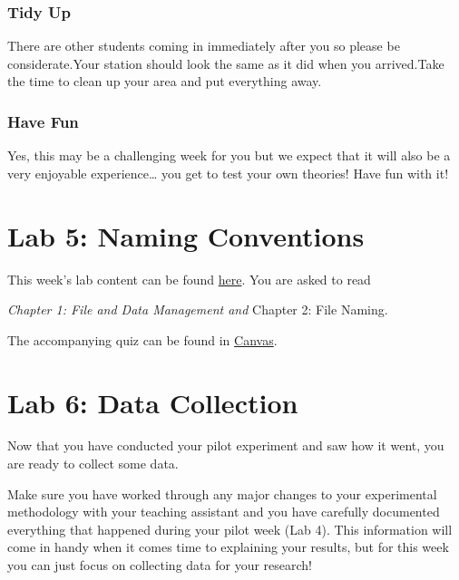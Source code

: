 \documentclass[
]{book}
\begin{document}
\hypertarget{tidy-up}{%
\subsection*{Tidy Up}\label{tidy-up}}

There are other students coming in immediately after you so please be considerate.Your station should look the same as it did when you arrived.Take the time to clean up your area and put everything away.

\hypertarget{have-fun}{%
\subsection*{Have Fun}\label{have-fun}}

Yes, this may be a challenging week for you but we expect that it will also be a very enjoyable experience\ldots{} you get to test your own theories! Have fun with it!

\hypertarget{lab-5-naming-conventions}{%
\chapter*{Lab 5: Naming Conventions}\label{lab-5-naming-conventions}}

This week's lab content can be found \href{https://ubco-biology.github.io/Procedures-and-Guidelines/file-and-data-management.html}{here}. You are asked to read

\emph{Chapter 1: File and Data Management and
} Chapter 2: File Naming.

The accompanying quiz can be found in \href{https://canvas.ubc.ca}{Canvas}.

\hypertarget{lab-6-data-collection}{%
\chapter*{Lab 6: Data Collection}\label{lab-6-data-collection}}

Now that you have conducted your pilot experiment and saw how it went, you are ready to collect some data.

Make sure you have worked through any major changes to your experimental methodology with your teaching assistant and you have carefully documented everything that happened during your pilot week (Lab 4). This information will come in handy when it comes time to explaining your results, but for this week you can just focus on collecting data for your research!
\end{document}
